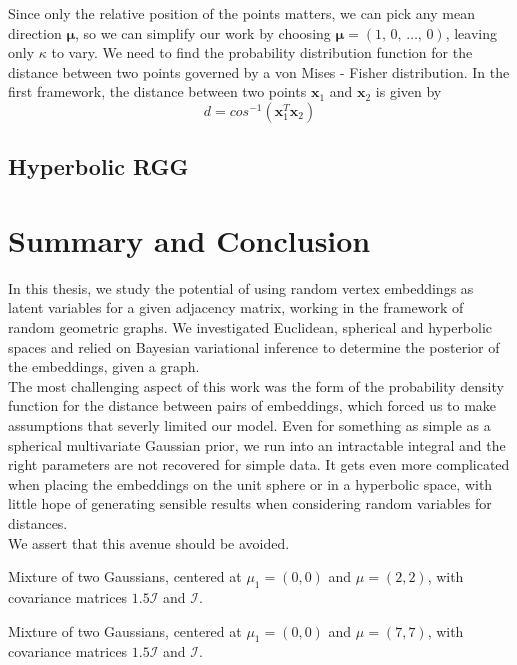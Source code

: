 \documentclass[12pt]{report}
\newcommand{\bs}{\boldsymbol}
\newcommand{\mc}[1]{\mathcal{#1}}
\renewcommand{\bs}{\boldsymbol}
\begin{document}
Since only the relative position of the points matters, we can pick any mean direction $\bs{\mu}$, so we can simplify our work by choosing $\bs{\mu} = (1,\,0,\,\dots,\,0)$, leaving only $\kappa$ to vary. We need to find the probability distribution function for the distance between two points governed by a von Mises - Fisher distribution. In the first framework, the distance between two points $\bs{x}_1$ and $\bs{x}_2$ is given by
\begin{equation}
    d = cos^{-1}(\bs{x}_1^T\bs{x}_2)
\end{equation}

\section{Hyperbolic RGG}

\chapter{Summary and Conclusion}
In this thesis, we study the potential of using random vertex embeddings as latent variables for a given adjacency matrix, working in the framework of random geometric graphs. We investigated Euclidean, spherical and hyperbolic spaces and relied on Bayesian variational inference to determine the posterior of the embeddings, given a graph. \\

The most challenging aspect of this work was the form of the probability density function for the distance between pairs of embeddings, which forced us to make assumptions that severly limited our model. Even for something as simple as a spherical multivariate Gaussian prior, we run into an intractable integral and the right parameters are not recovered for simple data. It gets even more complicated when placing the embeddings on the unit sphere or in a hyperbolic space, with little hope of generating sensible results when considering random variables for distances. \\

We assert that this avenue should be avoided.


\centering
\begin{table}
    \centering
    \tiny
    \caption{Mixture of two Gaussians, centered at $\mu_1 = (0, 0)$ and $\mu = (2, 2)$, with covariance matrices $1.5\mc{I}$ and $\mc{I}$.}
\end{table}

\centering
\begin{table}
    \centering
    \tiny
    \caption{Mixture of two Gaussians, centered at $\mu_1 = (0, 0)$ and $\mu = (7, 7)$, with covariance matrices $1.5\mc{I}$ and $\mc{I}$.}
\end{table}
\end{document}
